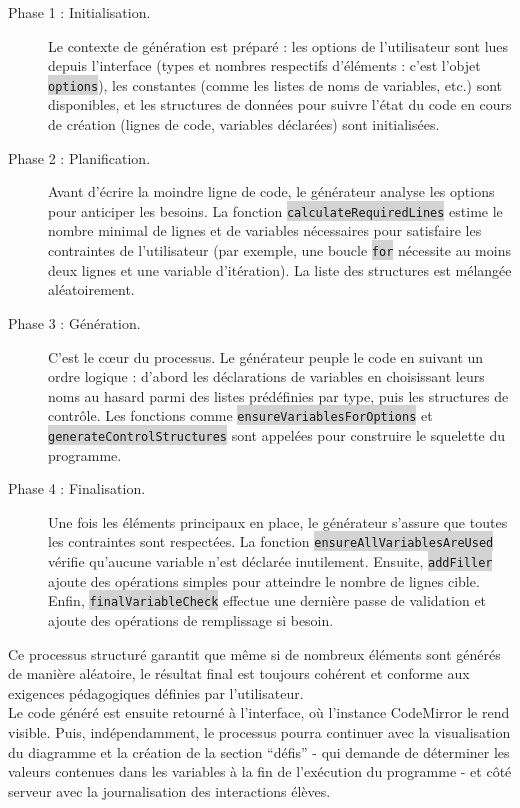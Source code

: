 \documentclass[11pt,a4paper]{article}
\newcommand{\code}[1]{\colorbox{lightgray}{\texttt{\small #1}}}
\begin{document}
\begin{description}
    \item[Phase 1 : Initialisation.] Le contexte de génération est préparé : les options de l'utilisateur sont lues depuis l'interface (types et nombres respectifs d'éléments : c'est l'objet \code{options}), les constantes (comme les listes de noms de variables, etc.) sont disponibles, et les structures de données pour suivre l'état du code en cours de création (lignes de code, variables déclarées) sont initialisées.
    \item[Phase 2 : Planification.] Avant d'écrire la moindre ligne de code, le générateur analyse les options pour anticiper les besoins. La fonction \code{calculateRequiredLines} estime le nombre minimal de lignes et de variables nécessaires pour satisfaire les contraintes de l'utilisateur (par exemple, une boucle \code{for} nécessite au moins deux lignes et une variable d'itération). La liste des structures est mélangée aléatoirement.
    \item[Phase 3 : Génération.] C'est le cœur du processus. Le générateur peuple le code en suivant un ordre logique : d'abord les déclarations de variables en choisissant leurs noms au hasard parmi des listes prédéfinies par type, puis les structures de contrôle. Les fonctions comme \code{ensureVariablesForOptions} et \code{generateControlStructures} sont appelées pour construire le squelette du programme.
    \item[Phase 4 : Finalisation.] Une fois les éléments principaux en place, le générateur s'assure que toutes les contraintes sont respectées. La fonction \code{ensureAllVariablesAreUsed} vérifie qu'aucune variable n'est déclarée inutilement. Ensuite, \code{addFiller} ajoute des opérations simples pour atteindre le nombre de lignes cible. Enfin, \code{finalVariableCheck} effectue une dernière passe de validation et ajoute des opérations de remplissage si besoin.
\end{description}
Ce processus structuré garantit que même si de nombreux éléments sont générés de manière aléatoire, le résultat final est toujours cohérent et conforme aux exigences pédagogiques définies par l'utilisateur.\\

Le code généré est ensuite retourné à l'interface, où l'instance CodeMirror le rend visible. Puis, indépendamment, le processus pourra continuer avec la visualisation du diagramme et la création de la section ``défis'' - qui demande de déterminer les valeurs contenues dans les variables à la fin de l'exécution du programme - et côté serveur avec la journalisation des interactions élèves.\\
\end{document}

